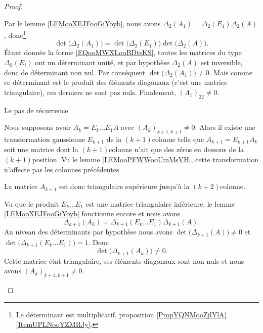 \begin{proof}
\begin{subproof}
            Par le lemme \ref{LEMooXEJFooGiYoyb}, nous avons \( \Delta_2(A_1)=\Delta_2(E_1)\Delta_2(A)\), donc\footnote{Le déterminant est multiplicatif, proposition \ref{PropYQNMooZjlYlA}\ref{ItemUPLNooYZMRJy}.}
            \begin{equation}
                \det\big( \Delta_2(A_1) \big)=\det\big( \Delta_2(E_1) \big)\det\big( \Delta_2(A) \big).
            \end{equation}
            Étant donnée la forme \eqref{EQooMWXLooBDtsKS}, toutes les matrices du type \( \Delta_k(E_i)\) ont un déterminant unité, et par hypothèse \( \Delta_2(A)\) est inversible, donc de déterminant non nul. Par conséquent \( \det\big( \Delta_2(A_1) \big)\neq 0\). Mais comme ce déterminant est le produit des éléments diagonaux (c'est une matrice triangulaire), ces derniers ne sont pas nuls. Finalement, \( (A_1)_22\neq 0\).

        \item[Le pas de récurrence]

            Nous supposons avoir \( A_k=E_k\ldots E_1A\) avec \( (A_k)_{k+1,k+1}\neq 0\). Alors il existe une transformation gaussienne \( E_{k+1}\) de la \( (k+1)\)\ieme colonne telle que \( A_{k+1}=E_{k+1}A_k\) soit une matrice dont la \( (k+1)\)\ieme colonne n'ait que des zéros en dessous de la \( (k+1)\)\ieme position. Vu le lemme \ref{LEMooPFWWooUmMsVH}, cette transformation n'affecte pas les colonnes précédentes. 

            La matrice \( A_{k+1}\) est donc triangulaire supérieure jusqu'à la \( (k+2)\)\ieme colonne.

            Vu que le produit \( E_k\ldots E_1\) est une matrice triangulaire inférieure, le lemme \ref{LEMooXEJFooGiYoyb} fonctionne encore et nous avons
            \begin{equation}
                \Delta_{k+1}(A_k)=\Delta_{k+1}(E_k\ldots E_1)\Delta_{k+1}(A).
            \end{equation}
            Au niveau des déterminants par hypothèse nous avons \( \det\big( \Delta_{k+1}(A) \big)\neq 0\) et \( \det\big( \Delta_{k+1}(E_k\ldots E_1) \big)=1\). Donc
            \begin{equation}
                \det\big( \Delta_{k+1}(A_k) \big)\neq 0.
            \end{equation}
            Cette matrice état triangulaire, ses éléments diagonaux sont non nuls et nous avons \( (A_k)_{k+1,k+1}\neq 0\).
    \end{subproof}


\end{proof}
